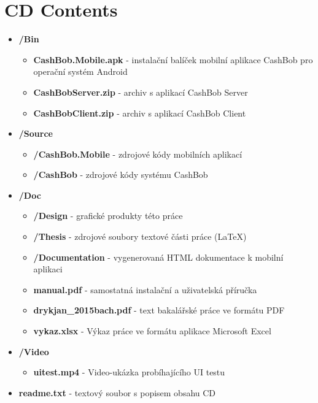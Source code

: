 \chapter{CD Contents}
\label{ch:cdcontents}

\begin{itemize}
\item \textbf{/Bin}
    \begin{itemize}
    \item \textbf{CashBob.Mobile.apk} - instalační balíček mobilní aplikace CashBob pro operační systém Android
    \item \textbf{CashBobServer.zip} - archiv s aplikací CashBob Server
    \item \textbf{CashBobClient.zip} - archiv s aplikací CashBob Client
    \end{itemize}
    
\item \textbf{/Source}
    \begin{itemize}
    \item \textbf{/CashBob.Mobile} - zdrojové kódy mobilních aplikací
    \item \textbf{/CashBob} - zdrojové kódy systému CashBob
    \end{itemize}
\item \textbf{/Doc}
    \begin{itemize}
    \item \textbf{/Design} - grafické produkty této práce
    \item \textbf{/Thesis} - zdrojové soubory textové části práce (\LaTeX)
    \item \textbf{/Documentation} - vygenerovaná HTML dokumentace k mobilní aplikaci
    \item \textbf{manual.pdf} - samostatná instalační a uživatelská příručka
    \item \textbf{drykjan\_2015bach.pdf} - text bakalářské práce ve formátu PDF
    \item \textbf{vykaz.xlsx} - Výkaz práce ve formátu aplikace  Microsoft Excel
    \end{itemize}

\item \textbf{/Video}
    \begin{itemize}
    \item \textbf{uitest.mp4} - Video-ukázka probíhajícího UI testu
    \end{itemize}
\item \textbf{readme.txt} - textový soubor s popisem obsahu CD
\end{itemize}